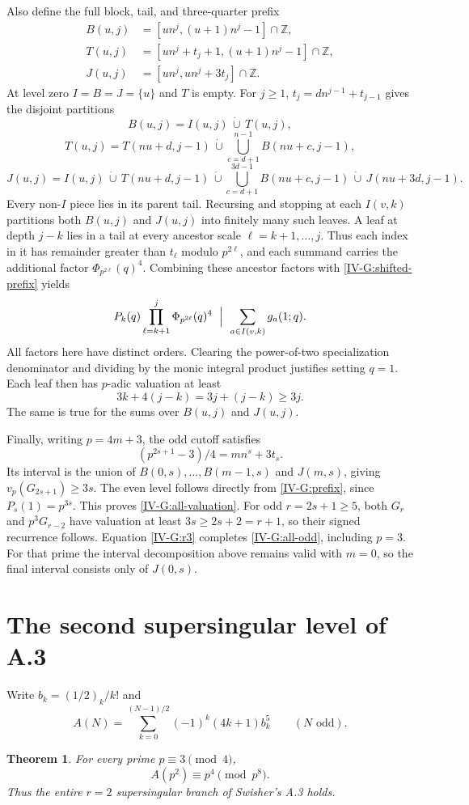 \documentclass[11pt,letterpaper]{article}
\newtheorem{theorem}{Theorem}[section]
\numberwithin{equation}{section}
\begin{document}
Also define the full block, tail, and three-quarter prefix
\[
\begin{split}
B(u,j)&=[un^j,(u+1)n^j-1]\cap\mathbb Z,\\
T(u,j)&=[un^j+t_j+1,(u+1)n^j-1]\cap\mathbb Z,\\
J(u,j)&=[un^j,un^j+3t_j]\cap\mathbb Z.
\end{split}
\]
At level zero $I=B=J=\{u\}$ and $T$ is empty. For $j\ge1$,
$t_j=dn^{j-1}+t_{j-1}$ gives the disjoint partitions
\[
B(u,j)=I(u,j)\,\dot\cup\,T(u,j),
\]
\[
T(u,j)=T(nu+d,j-1)\,\dot\cup\!
\bigcup_{c=d+1}^{n-1} B(nu+c,j-1),
\]
\[
J(u,j)=I(u,j)\,\dot\cup\,T(nu+d,j-1)
\,\dot\cup\!\bigcup_{c=d+1}^{3d-1} B(nu+c,j-1)
\,\dot\cup\,J(nu+3d,j-1).
\]
Every non-$I$ piece lies in its parent tail. Recursing and
stopping at each $I(v,k)$ partitions both $B(u,j)$ and $J(u,j)$
into finitely many such leaves. A leaf at depth $j-k$ lies in
a tail at every ancestor scale $\ell=k+1,\ldots,j$.
Thus each index in it has remainder greater than $t_\ell$
modulo $p^{2\ell}$, and each summand carries the additional
factor $\Phi_{p^{2\ell}}(q)^4$. Combining these ancestor factors
with \eqref{IV-G:shifted-prefix} yields
\[
P_k(q)\prod_{\ell=k+1}^{j}\Phi_{p^{2\ell}}(q)^4
\ \Bigm|\ \sum_{a\in I(v,k)}g_a(1;q).
\]
All factors here have distinct orders. Clearing the power-of-two
specialization denominator and dividing by the monic integral
product justifies setting $q=1$. Each leaf then has $p$-adic
valuation at least
\[
3k+4(j-k)=3j+(j-k)\ge3j.
\]
The same is true for the sums over $B(u,j)$ and $J(u,j)$.

Finally, writing $p=4m+3$, the odd cutoff satisfies
\[
(p^{2s+1}-3)/4=mn^s+3t_s.
\]
Its interval is the union of $B(0,s),\ldots,B(m-1,s)$ and
$J(m,s)$, giving $v_p(G_{2s+1})\ge3s$. The even level follows
directly from \eqref{IV-G:prefix}, since $P_s(1)=p^{3s}$.
This proves \eqref{IV-G:all-valuation}. For odd $r=2s+1\ge5$, both
$G_r$ and $p^3G_{r-2}$ have valuation at least $3s\ge2s+2=r+1$,
so their signed recurrence follows. Equation \eqref{IV-G:r3} completes \eqref{IV-G:all-odd}, including $p=3$.
For that prime the interval decomposition above remains valid with
$m=0$, so the final interval consists only of $J(0,s)$.

\section{The second supersingular level of A.3}\label{loc-IV-7}
\label{IV-sec:a-second-level}
Write $b_k=(1/2)_k/k!$ and
\[
 A(N)=\sum_{k=0}^{(N-1)/2}(-1)^k(4k+1)b_k^5
 \qquad(N\text{ odd}).
\]
\begin{theorem}\label{IV-thm:a-r2}
For every prime $p\equiv3\pmod4$,
\[
 \boxed{A(p^2)\equiv p^4\pmod{p^8}.}
\]
Thus the entire $r=2$ supersingular branch of Swisher's A.3 holds.
\end{theorem}
\end{document}
